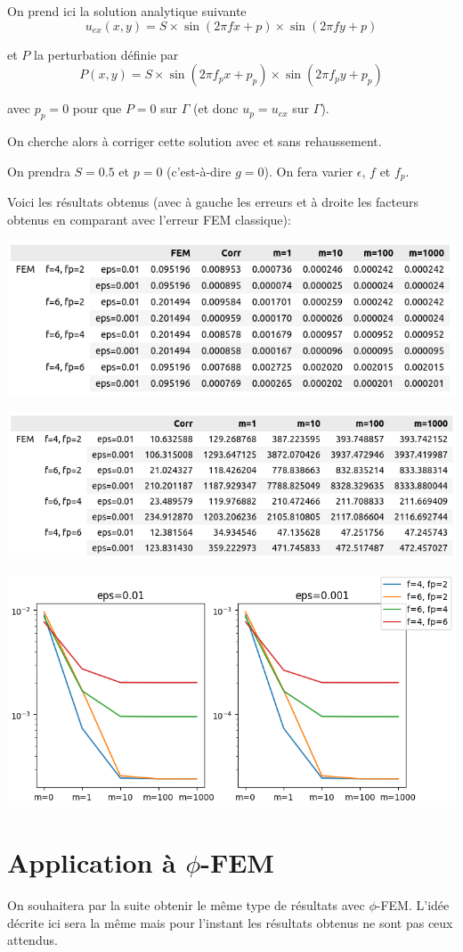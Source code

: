 \documentclass[french]{article}
\begin{document}
	On prend ici la solution analytique suivante
	$$u_{ex}(x,y) = S\times\sin(2\pi fx + p)\times\sin(2\pi fy + p)$$ 
	
	et $P$ la perturbation définie par
	$$P(x,y)=S\times\sin(2\pi f_px + p_p)\times\sin(2\pi f_py + p_p)$$
	
	avec $p_p=0$ pour que $P=0$ sur $\Gamma$ (et donc $u_p=u_{ex}$ sur $\Gamma$). 
	
	On cherche alors à corriger cette solution avec et sans rehaussement.
	
	On prendra $S=0.5$ et $p=0$ (c'est-à-dire $g=0$). On fera varier $\epsilon$, $f$ et $f_p$. 
	
	\newpage
	
	Voici les résultats obtenus (avec à gauche les erreurs et à droite les facteurs obtenus en comparant avec l'erreur FEM classique):
	
	\begin{minipage}{0.48\linewidth}
		\centering
		\includegraphics[width=\linewidth]{erreur.png}
	\end{minipage}
	\begin{minipage}{0.48\linewidth}
		\centering
		\includegraphics[width=\linewidth]{facteur.png}
	\end{minipage}
	
	\begin{minipage}{\linewidth}
		\centering
		\includegraphics[width=0.6\linewidth]{courbes.png}
	\end{minipage}

	\section*{Application à $\phi$-FEM}
	
	On souhaitera par la suite obtenir le même type de résultats avec $\phi$-FEM. L'idée décrite ici sera la même mais pour l'instant les résultats obtenus ne sont pas ceux attendus.
	
\end{document}
